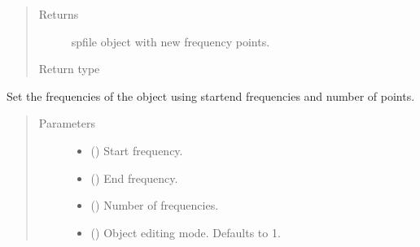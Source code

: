 \documentclass[letterpaper,10pt,english]{sphinxmanual}
\begin{document}
\begin{fulllineitems}
\begin{fulllineitems}
\begin{quote}
\begin{description}
\begin{itemize}
\end{itemize}

\item[{Returns}] \leavevmode
spfile object with new frequency points.

\item[{Return type}] \leavevmode
{\hyperref[\detokenize{touchstone:touchstone.spfile}]{}}

\end{description}\end{quote}

\end{fulllineitems}


\begin{fulllineitems}
\label{\detokenize{touchstone:touchstone.spfile.set_frequency_points_array}}
Set the frequencies of the object using start\sphinxhyphen{}end frequencies and number of points.
\begin{quote}\begin{description}
\item[{Parameters}] \leavevmode\begin{itemize}
\item {} 
 (\sphinxstyleliteralemphasis{\sphinxupquote{{[}}}\sphinxstyleliteralemphasis{\sphinxupquote{{]}}}) \textendash{} Start frequency.

\item {} 
 (\sphinxstyleliteralemphasis{\sphinxupquote{{[}}}\sphinxstyleliteralemphasis{\sphinxupquote{{]}}}) \textendash{} End frequency.

\item {} 
 () \textendash{} Number of frequencies.

\item {} 
 (\sphinxstyleliteralemphasis{\sphinxupquote{, }}) \textendash{} Object editing mode. Defaults to \sphinxhyphen{}1.


\end{itemize}
\end{description}
\end{quote}
\end{fulllineitems}
\end{fulllineitems}
\end{document}
